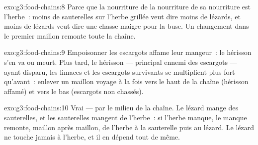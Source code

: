 \begin{solution}{exo:g3:food-chains:8}
Parce que la nourriture de la nourriture de sa nourriture est
l'herbe~: moins de sauterelles sur l'herbe grillée veut dire moins
de lézards, et moins de lézards veut dire une chasse maigre pour la
buse. Un changement dans le premier maillon remonte toute la chaîne.
\end{solution}

\begin{solution}{exo:g3:food-chains:9}
Empoisonner les escargots affame leur mangeur~: le hérisson s'en va
ou meurt. Plus tard, le hérisson --- principal ennemi des escargots
--- ayant disparu, les limaces et les escargots survivants se
multiplient plus fort qu'avant~: enlever un maillon voyage à la fois
vers le haut de la chaîne (hérisson affamé) et vers le bas
(escargots non chassés).
\end{solution}

\begin{solution}{exo:g3:food-chains:10}
Vrai --- par le milieu de la chaîne. Le lézard mange des
sauterelles, et les sauterelles mangent de l'herbe~: si l'herbe
manque, le manque remonte, maillon après maillon, de l'herbe à la
sauterelle puis au lézard. Le lézard ne touche jamais à l'herbe, et
il en dépend tout de même.
\end{solution}
